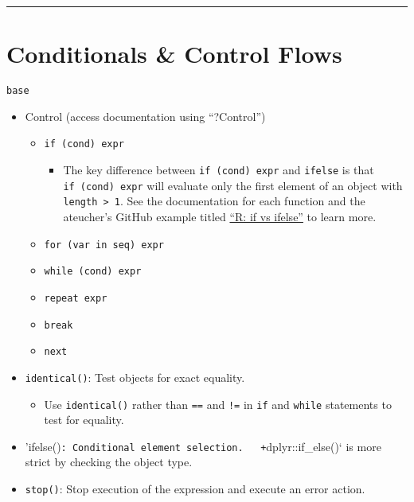 \documentclass[]{book}
\providecommand{\tightlist}{%
  \setlength{\itemsep}{0pt}\setlength{\parskip}{0pt}}
\begin{document}
\begin{center}\rule{0.5\linewidth}{\linethickness}\end{center}

\hypertarget{conditionals-control-flows}{%
\section{Conditionals \& Control Flows}\label{conditionals-control-flows}}

\texttt{base}

\begin{itemize}
\tightlist
\item
  Control (access documentation using ``?Control'')

  \begin{itemize}
  \tightlist
  \item
    \texttt{if\ (cond)\ expr}

    \begin{itemize}
    \tightlist
    \item
      The key difference between \texttt{if\ (cond)\ expr} and \texttt{ifelse} is that \texttt{if\ (cond)\ expr} will evaluate only the first element of an object with \texttt{length\ \textgreater{}\ 1}. See the documentation for each function and the ateucher's GitHub example titled \href{https://gist.github.com/ateucher/c7359f566eded9fcd4a255f4cbd4fe67}{``R: if vs ifelse''} to learn more.
    \end{itemize}
  \item
    \texttt{for\ (var\ in\ seq)\ expr}
  \item
    \texttt{while\ (cond)\ expr}
  \item
    \texttt{repeat\ expr}
  \item
    \texttt{break}
  \item
    \texttt{next}
  \end{itemize}
\item
  \texttt{identical()}: Test objects for exact equality.

  \begin{itemize}
  \tightlist
  \item
    Use \texttt{identical()} rather than \texttt{==} and \texttt{!=} in \texttt{if} and \texttt{while} statements to test for equality.
  \end{itemize}
\item
  'ifelse()\texttt{:\ Conditional\ element\ selection.\ \ \ +}dplyr::if\_else()` is more strict by checking the object type.
\item
  \texttt{stop()}: Stop execution of the expression and execute an error action.


\end{itemize}
\end{document}
